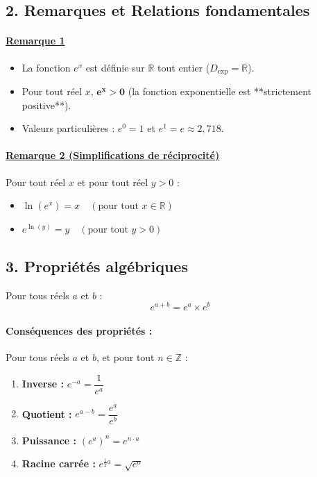 \documentclass[12pt,a4paper]{article}
\begin{document}
\vspace{0.3cm}

\subsection*{\color{myred}2. Remarques et Relations fondamentales}

\paragraph{\underline{Remarque 1}}
\begin{itemize}
    \item La fonction $e^x$ est définie sur $\mathbb{R}$ tout entier ($D_{\exp} = \mathbb{R}$).
    \item Pour tout réel $x$, $\mathbf{e^x > 0}$ (la fonction exponentielle est **strictement positive**).
    \item Valeurs particulières : $e^0 = 1$ et $e^1 = e \approx 2{,}718$.
\end{itemize}

\vspace{0.3cm}

\paragraph{\underline{Remarque 2 (Simplifications de réciprocité)}}
Pour tout réel $x$ et pour tout réel $y > 0$ :
\begin{itemize}
    \item $\ln(e^x) = x \quad (\text{pour tout } x \in \mathbb{R})$
    \item $e^{\ln(y)} = y \quad (\text{pour tout } y > 0)$
\end{itemize}

\subsection*{\color{myred}3. Propriétés algébriques}

\begin{tcolorbox}[colback=red!5!white,colframe=myred,title=\textbf{Propriété fondamentale (Produit)}]
Pour tous réels $a$ et $b$ :
\[
e^{a + b} = e^a \times e^b
\]
\end{tcolorbox}

\paragraph{Conséquences des propriétés :}
Pour tous réels $a$ et $b$, et pour tout $n \in \mathbb{Z}$ :
\begin{enumerate}[label=\alph*)]
    \item \textbf{Inverse :} $e^{-a} = \dfrac{1}{e^a}$
    \item \textbf{Quotient :} $e^{a - b} = \dfrac{e^a}{e^b}$
    \item \textbf{Puissance :} $(e^a)^n = e^{n \cdot a}$
    \item \textbf{Racine carrée :} $e^{\frac{1}{2}a} = \sqrt{e^a}$
\end{enumerate}
\end{document}
